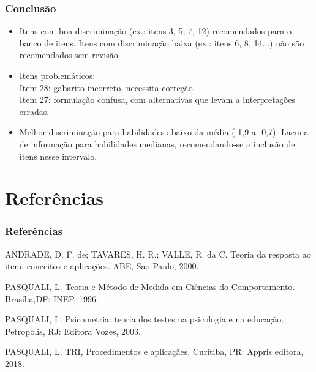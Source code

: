 \documentclass{beamer}
\begin{document}
		\begin{frame}
		\frametitle{Conclusão}
		
		\begin{itemize}
		
			\item Itens com boa discriminação (ex.: itens 3, 5, 7, 12) recomendados para o banco de itens. Itens com discriminação baixa (ex.: itens 6, 8, 14...) não são recomendados sem revisão.
			\item Itens problemáticos:\\
			Item 28: gabarito incorreto, necessita correção.\\
			Item 27: formulação confusa, com alternativas que levam a interpretações erradas.\\
			\item  Melhor discriminação para habilidades abaixo da média (-1,9 a -0,7).
			Lacuna de informação para habilidades medianas, recomendando-se a inclusão de itens nesse intervalo.\\		
			
		\end{itemize}
		
		
	\end{frame}
	
	
	\section{Referências}
	
	
	
	\begin{frame}
	\frametitle{Referências}
	
	ANDRADE, D. F. de; TAVARES, H. R.; VALLE, R. da C. Teoria da resposta ao item: conceitos e	aplicações. ABE, Sao Paulo, 2000. \newline	
	
		
	PASQUALI, L. Teoria e Método de Medida em Ciências do Comportamento. Brasília,DF: INEP, 1996.\newline
	
	PASQUALI, L. Psicometria: teoria dos testes na psicologia e na educação. Petropolis, RJ: Editora Vozes, 2003.\newline
	
	PASQUALI, L. TRI, Procedimentos e aplicaçães. Curitiba, PR: Appris editora, 2018.


	\end{frame}
	
	
	

	
\end{document}
